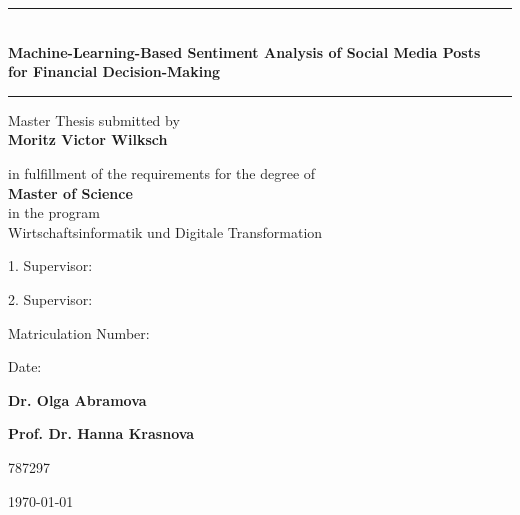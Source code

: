 \begin{titlepage}
\begin{center}
			\vspace*{2cm}
	
				\begin{center}
						\rule{\textwidth}{0.5pt}\\			%
						\vspace*{0.5cm}
						\doublespacing 
						\large{\textbf{
									Machine-Learning-Based Sentiment Analysis of Social Media Posts\\
									for Financial Decision-Making
									}}
						\vspace*{0.5cm} 
						\rule{\textwidth}{0.5pt}			%
						        
						\normalsize	\vspace*{0.25cm} 
						
									Master Thesis submitted by \\
									\textbf{Moritz Victor Wilksch}
									
						 			 in fulfillment of the requirements for the degree of\\
						 			\textbf{ Master of Science} \\ 
						 			in the program \\
						 			Wirtschaftsinformatik und Digitale Transformation
					\end{center}    
					

			\vfill
			
			

				\begin{minipage}[t]{14cm}
							\begin{minipage}[t]{5.5cm}
									1. Supervisor: 
									
									2. Supervisor:\vspace*{0.5cm} 
									
									Matriculation Number:
									
									Date:
									
							\end{minipage}
							\begin{minipage}[t]{8cm} 
									\textbf{Dr. Olga Abramova}
									
									\textbf{Prof. Dr. Hanna Krasnova} \vspace*{0.5cm}
									
									787297
									
									\today
							\end{minipage} 
				\end{minipage}

			\vspace*{1cm}
	\end{center}
\end{titlepage}